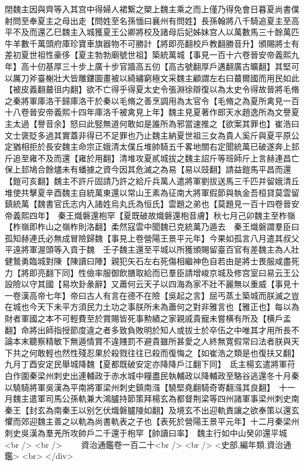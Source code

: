 閉魏主因與齊等入其宫中得婦人裙繋之槊上魏主乘之而上僅乃得免會日暮夏尚書僕射問至奉夏主之母出走【問姓至名孫愐曰襄州有問姓】長孫翰將八千騎追夏主至高平不及而還乙巳魏主入城獲夏王公卿將校及諸母后妃姊妹宫人以萬數馬三十餘萬匹牛羊數千萬頭府庫珍寶車旗器物不可勝計【將即亮翻校戶教翻勝音升】頒賜將士有差初夏世祖性豪侈【夏主勃勃廟號世祖】築統萬城【事見一百十六卷晉安帝義熙九年】高十仞基厚三十步上廣十步官牆高五仞【高古號翻厚戶遘翻廣古曠翻】其堅可以厲刀斧臺榭壯大皆雕鏤圖畫被以綺繡窮極文采魏主顧謂左右曰蕞爾國而用民如此【被皮義翻蕞徂内翻】欲不亡得乎得夏太史令張淵徐辯復以為太史令得故晉將毛脩之秦將軍庫洛干歸庫洛干於秦以毛脩之善烹調用為太官令【毛脩之為夏所禽見一百十八卷晉安帝義熙十四年庫洛千被禽見上年】魏主見夏著作郎天水趙逸所為文譽夏主太過【譽音余】怒曰此竪無道何敢如是誰所為邪當速推之【欲案其罪也】崔浩曰文士褒貶多過其實蓋非得已不足罪也乃止魏主納夏世祖三女為貴人奚斤與夏平原公定猶相拒於長安魏主命宗正娥清太僕丘堆帥騎五千畧地關右定聞統萬已破遂奔上邽斤追至雍不及而還【雍於用翻】清堆攻夏貳城拔之魏主詔斤等班師斤上言赫連昌亡保上邽鳩合餘燼未有蟠據之資今因其危滅之為易【易以豉翻】請益鎧馬平昌而還【鎧可亥翻】魏主不許斤固請乃許之給斤兵萬人遣將軍劉拔送馬三千匹并留娥清丘堆使共擊夏辛酉魏主自統萬東還以常山王素為征南大將軍假節與執金吾桓貸莫雲留鎮統萬【魏書官氏志内入諸姓烏丸氏為恒氏】雲題之弟也【莫題見一百十四卷晉安帝義熙四年】　秦王熾磐還枹罕【夏既破故熾磐還枹音膚】秋七月己卯魏主至柞嶺【柞嶺即柞山之嶺柞則洛翻】柔然寇雲中聞魏已克統萬乃遁去　秦王熾磐謂羣臣曰孤知赫連氏必無成冒險歸魏【事見上卷營陽王景平元年】今果如孤言八月遣其叔父平遠將軍渥頭等入貢于魏　壬子魏主還至平城以所獲頒賜留臺百官有差魏主為人壯健鷙勇臨城對陳【陳讀曰陣】親犯矢石左右死傷相繼神色自若由是將士畏服咸盡死力【將即亮翻下同】性儉率服御飲膳取給而已羣臣請增峻京城及修宫室曰易云王公設險以守其國【易坎卦彖辭】又蕭何云天子以四海為家不壯不麗無以重威【事見十一卷漢高帝七年】帝曰古人有言在德不在險【吳起之言】屈丐蒸土築城而朕滅之豈在城也今天下未平方須民力土功之事朕所未為蕭何之對非雅言也【雅正也】每以為財者軍國之本不可輕費至於賞賜皆死事勲績之家親戚貴寵未嘗横有所及【横戶孟翻】命將出師指授節度違之者多致負敗明於知人或拔士於卒伍之中唯其才用所長不論本末聽察精敏下無遁情賞不違賤罰不避貴雖所甚愛之人終無寛假常曰法者朕與天下共之何敢輕也然性殘忍果於殺戮往往已殺而復悔之【如崔浩之類是也復扶又翻】　九月丁酉安定民舉城降魏【夏都既破安定亦降降戶江翻下同】　氐主楊玄遣將軍苻白作圍秦梁州刺史出連輔政于赤水城中糧盡民執輔政以降輔政至駱谷逃還冬十月秦以驍騎將軍吳漢為平南將軍梁州刺史鎮南漒【驍堅堯翻騎奇寄翻漒其良翻】　十一月魏主遣軍司馬公孫軌兼大鴻臚持節策拜楊玄為都督荆梁等四州諸軍事梁州刺史南秦王【封玄為南秦王以别乞伏熾磐臚陵如翻】及境玄不出迎軌責讓之欲奉策以還玄懼而郊迎魏主善之以軌為尚書軌表之子也【表死於營陽王景平元年】十二月秦梁州刺史吳漢為羣羌所攻帥戶二千還于枹罕【帥讀曰率】　魏主行如中山癸卯還平城<br />
<br />
　　資治通鑑卷一百二十<br />
<br />
<史部,編年類,資治通鑑>  <br>
   </div> 

